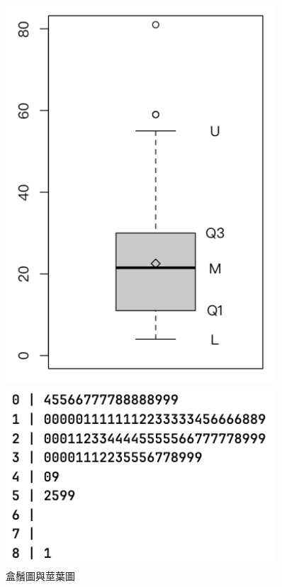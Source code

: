     \begin{figure}[htbp]
        \centering
        \begin{minipage}{.5\textwidth}
            \centering
            \includegraphics[width=0.9\textwidth]{figures/02-Descriptive_statistics/boxplot.png}
        \end{minipage}%
        \begin{minipage}{.5\textwidth}
            \centering
            \includegraphics[width=0.9\textwidth]{figures/02-Descriptive_statistics/stem_and_leaf.png}
        \end{minipage}
        \caption{盒鬚圖與莖葉圖}
        \label{fig:boxplot_stem}
    \end{figure}

